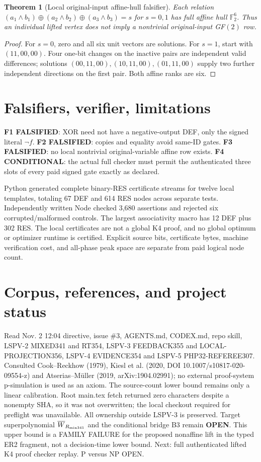 \documentclass[11pt]{article}
\newtheorem{theorem}{Theorem}
\begin{document}
\begin{theorem}[Local original-input affine-hull falsifier]
Each relation $(a_1\wedge b_1)\oplus(a_2\wedge b_2)\oplus(a_3\wedge b_3)=s$ for $s=0,1$ has full affine hull $\mathbb F_2^6$. Thus an individual lifted vertex does not imply a nontrivial original-input GF$(2)$ row.
\end{theorem}
\begin{proof}
For $s=0$, zero and all six unit vectors are solutions. For $s=1$, start with $(11,00,00)$. Four one-bit changes on the inactive pairs are independent valid differences; solutions $(00,11,00),(10,11,00),(01,11,00)$ supply two further independent directions on the first pair. Both affine ranks are six.
\end{proof}

\section*{Falsifiers, verifier, limitations}
\noindent\textbf{F1 FALSIFIED}: XOR need not have a negative-output DEF, only the signed literal $\neg f$. \textbf{F2 FALSIFIED}: copies and equality avoid same-ID gates. \textbf{F3 FALSIFIED}: no local nontrivial original-variable affine row exists. \textbf{F4 CONDITIONAL}: the actual full checker must permit the authenticated three slots of every paid signed gate exactly as declared.

\noindent Python generated complete binary-RES certificate streams for twelve local templates, totaling 67 DEF and 614 RES nodes across separate tests. Independently written Node checked 3,680 assertions and rejected six corrupted/malformed controls. The largest associativity macro has 12 DEF plus 302 RES. The local certificates are not a global K4 proof, and no global optimum or optimizer runtime is certified. Explicit source bits, certificate bytes, machine verification cost, and all-phase peak space are separate from paid logical node count.

\section*{Corpus, references, and project status}
Read Nov. 2 12:04 directive, issue \#3, AGENTS.md, CODEX.md, repo skill, LSPV-2 MIXED341 and RT354, LSPV-3 FEEDBACK355 and LOCAL-PROJECTION356, LSPV-4 EVIDENCE354 and LSPV-5 PHP32-REFEREE307. Consulted Cook--Reckhow (1979), Kiesl et al. (2020, DOI 10.1007/s10817-020-09554-z) and Atserias--M\"uller (2019, arXiv:1904.02991); no external proof-system p-simulation is used as an axiom. The source-count lower bound remains only a linear calibration. Root main.tex fetch returned zero characters despite a nonempty SHA, so it was not overwritten; the local checkout required for preflight was unavailable. All ownership outside LSPV-3 is preserved. Target superpolynomial $\overline W_{R_{\rm mix341}}$ and the conditional bridge B3 remain \textbf{OPEN}. This upper bound is a FAMILY FAILURE for the proposed nonaffine lift in the typed ER2 fragment, not a decision-time lower bound. Next: full authenticated lifted K4 proof checker replay. P versus NP OPEN.
\end{document}
